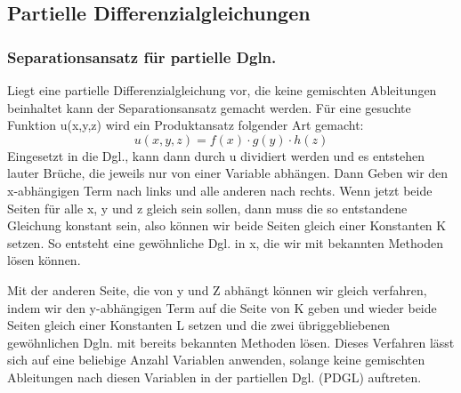 \documentclass[
	11pt, %
]{beamer}
\begin{document}
\subsection{Partielle Differenzialgleichungen}
\begin{frame}
	\frametitle{Separationsansatz f\"ur partielle Dgln.}
  Liegt eine partielle Differenzialgleichung vor, die keine gemischten Ableitungen beinhaltet kann der Separationsansatz gemacht werden.
	F\"ur eine gesuchte Funktion u(x,y,z) wird ein Produktansatz folgender Art gemacht:
		\begin{equation}
			u(x,y,z) = f(x)\cdot g(y)\cdot h(z)
		\end{equation}
		Eingesetzt in die Dgl., kann dann durch u dividiert werden und es entstehen lauter Br\"uche, die jeweils nur von einer Variable abh\"angen. Dann Geben wir den x-abh\"angigen Term nach links und alle anderen nach rechts. Wenn jetzt beide Seiten f\"ur alle x, y und z gleich sein sollen, dann muss die so entstandene Gleichung konstant sein, also k\"onnen wir beide Seiten gleich einer Konstanten K setzen. So entsteht eine gew\"ohnliche Dgl. in x, die wir mit bekannten Methoden l\"osen k\"onnen.
\end{frame}
\begin{frame}
    Mit der anderen Seite, die von y und Z abh\"angt k\"onnen wir gleich verfahren, indem wir den y-abh\"angigen Term auf die Seite von K geben und wieder beide Seiten gleich einer Konstanten L setzen und die zwei \"ubriggebliebenen gew\"ohnlichen Dgln. mit bereits bekannten Methoden l\"osen. Dieses Verfahren l\"asst sich auf eine beliebige Anzahl Variablen anwenden, solange keine gemischten Ableitungen nach diesen Variablen in der partiellen Dgl. (PDGL) auftreten.
\end{frame}
\end{document}
